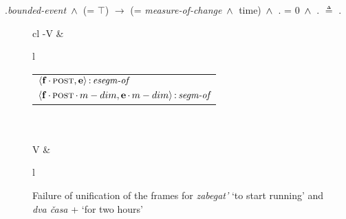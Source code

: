 \ex.\label{constr:duration}\textit{bounded-event} $\,\wedge\,$ (\DURATION = $\top$) $\rightarrow$ (\MDIM = \textit{measure-of-change} $\,\wedge\,$ time) $\,\wedge\,$  \MDIM . \MIN = 0 $\,\wedge\,$ \MDIM . \MAX $\triangleq$ \DURATION .\VAL



\begin{figure}
\hfill
\begin{tabular}[t]{cl}
-V &
\begin{tabular}[t]{l}
\\
\end{tabular}
\begin{footnotesize}
\begin{tabular}[t]{l}
$\langle{\textbf{\textrm{f}}\,{\cdot}\,\textsc{post},\textbf{\textrm{e}}}\rangle\,{:}\,\textit{esegm-of}$\\[1ex]
$\tuple{\btag{f}\BC\POST\C\MDIM,\btag{e}\BC\MDIM}\D\type{segm-of}$\\
\end{tabular}
\end{footnotesize}
\\\\
V &
\begin{tabular}[t]{l}
\\
\end{tabular}
\end{tabular}
\hfill
\caption{Failure of unification of the frames for \textit{zabegat'} `to start running' and \textit{dva \v{c}asa}  + `for two hours'}
\label{frame:zabegat:2hours}
\end{figure}


